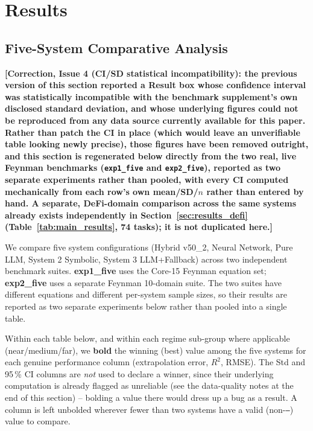 \documentclass[twoside,11pt]{article}
\begin{document}
\section{Results}
\label{sec:results}

\subsection{Five-System Comparative Analysis}\label{subsec:fivesystem-comparative-analysis-feynman-}
\label{sec:five_systems}

\textbf{[Correction, Issue 4 (CI/SD statistical incompatibility): the
previous version of this section reported a Result box whose confidence
interval was statistically incompatible with the benchmark supplement's own
disclosed standard deviation, and whose underlying figures could not be
reproduced from any data source currently available for this paper. Rather
than patch the CI in place (which would leave an unverifiable table looking
newly precise), those figures have been removed outright, and this section
is regenerated below directly from the two real, live Feynman benchmarks
(\texttt{exp1\_five} and \texttt{exp2\_five}), reported as two separate
experiments rather than pooled, with every CI computed mechanically from
each row's own mean/SD/$n$ rather than entered by hand.
A separate, DeFi-domain comparison across the same systems already exists
independently in Section~\ref{sec:results_defi} (Table~\ref{tab:main_results},
74 tasks); it is not duplicated here.]}

We compare five system configurations (Hybrid v50\_2, Neural Network, Pure
LLM, System 2 Symbolic, System 3 LLM+Fallback) across two independent
benchmark suites. \textbf{exp1\_five} uses the Core-15 Feynman equation set;
\textbf{exp2\_five} uses a separate Feynman 10-domain suite. The two suites
have different equations and different per-system sample sizes, so their
results are reported as two separate experiments below rather than pooled
into a single table.

Within each table below, and within each regime sub-group where applicable
(near/medium/far), we \textbf{bold} the winning (best) value among the five
systems for each genuine performance column (extrapolation error, $R^2$,
RMSE). The Std and 95\,\% CI columns are \emph{not} used to declare a winner,
since their underlying computation is already flagged as unreliable (see the
data-quality notes at the end of this section) -- bolding a value there would
dress up a bug as a result. A column is left unbolded wherever fewer than two
systems have a valid (non-\texttt{---}) value to compare.
\end{document}
